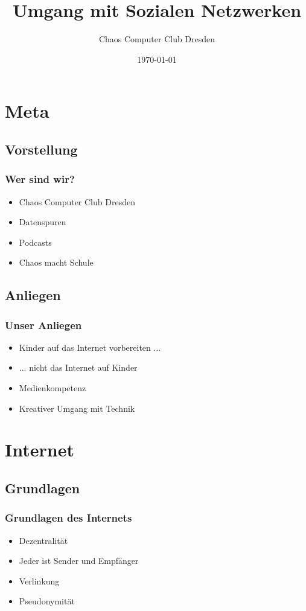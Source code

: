 \documentclass{beamer}
\title{Umgang mit Sozialen Netzwerken}
\author{Chaos Computer Club Dresden}
\date{\today}
\begin{document}
\maketitle
\frame{\tableofcontents}

\section{Meta}

\subsection{Vorstellung}

\begin{frame}
  \frametitle{Wer sind wir?}
  \begin{itemize}
    \item<1-> Chaos Computer Club Dresden
    \item<2-> Datenspuren
    \item<3-> Podcasts
    \item<4-> Chaos macht Schule
  \end{itemize}
\end{frame}

\subsection{Anliegen}

\begin{frame}
  \frametitle{Unser Anliegen}
  \begin{itemize}
    \item<1-> Kinder auf das Internet vorbereiten ...
    \item<2-> ... nicht das Internet auf Kinder
    \item<3-> Medienkompetenz
    \item<4-> Kreativer Umgang mit Technik
  \end{itemize}
\end{frame}

\section{Internet}

\subsection{Grundlagen}

\begin{frame}
  \frametitle{Grundlagen des Internets}
  \begin{itemize}
    \item<1-> Dezentralität
    \item<2-> Jeder ist Sender und Empfänger
    \item<3-> Verlinkung
    \item<4-> Pseudonymität
  \end{itemize}
\end{frame}
\end{document}
